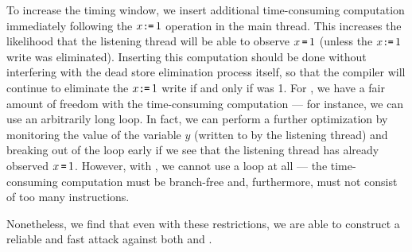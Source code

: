 \documentclass[conference]{IEEEtran}
\theoremstyle{plain}
\theoremstyle{definition}
\newcommand{\ignore}[1]{}
\begin{document}
\ignore{
First, rather than simply observing $x$ with $y\GETS x$ in the
`listening' thread, we continuously load $x$ in a loop until a
nonzero value is observed --- i.e., we perform
$\DO{r\GETS x} \WHILE(r\EQ0)$.
\ignore{
\begin{verbatim}
    do {
      r := x;
    } while(r == 0);
\end{verbatim}
}
This remedies the case where $y\GETS x$ could observe a value of $x$
from `before' either of the two possible writes performed by the other thread.
}

To increase the timing window, we insert additional time-consuming
computation immediately following
the $x\GETS 1$ operation in the main thread.
This increases the likelihood that the listening thread will be able to observe
$x\,\texttt{=}\, 1$ (unless the $x\GETS 1$ write was eliminated).
Inserting this computation should be done without interfering with the dead store
elimination process itself, so that the compiler will continue to eliminate
the $x\GETS 1$ write if and only if {\SEC} was 1.
For {\GCC}, we have a fair amount of freedom with the time-consuming
computation --- for instance, we can use an arbitrarily long loop.
In fact, we can perform a further optimization by monitoring the value of the
variable $y$ (written to by the listening thread) and breaking out of the
loop early if we see that the listening thread has already observed $x\,\texttt{=}\, 1$.
However, with {\CLANG}, we cannot use a loop at all --- the time-consuming
computation must be branch-free and, furthermore, must not consist of too many
instructions.
\ignore{
This is because {\CLANG}'s dead store elimination pass operates only
within basic blocks, and uses a heuristic to stop scanning the basic block
early if it is too large.
}
Nonetheless, we find that even with these restrictions, we are able to
construct a reliable and fast attack against both {\CLANG} and {\GCC}.

\ignore{
Finally, we redundantly execute the entire attack several times, noting the
final value of $y$ (the first observed nonzero value of $x$) in each
case.
We note that if \emph{any} of the redundant runs produces $y\EQ 1$ for a
particular bit position, we can be certain that the corresponding bit of
{\SEC} \emph{must} be $0$, as it implies that the $x\GETS 1$ write
was not eliminated in that particular function.
On the other hand, the more runs that observe $y\EQ 2$ in a particular bit
position despite our other reliability-increasing measures taken above, the
more certain we can be that the $x\GETS 1$ write was eliminated in that
function, and {\SEC} is $1$.
}
\end{document}

